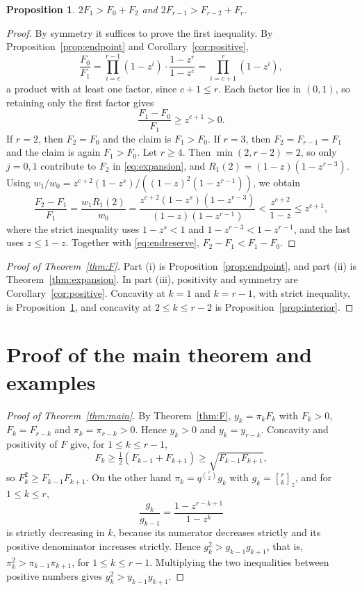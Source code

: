 \documentclass{amsart}
\newtheorem{proposition}[theorem]{Proposition}
\theoremstyle{remark}
\numberwithin{equation}{section}
\newcommand{\qbinom}[3]{\genfrac{[}{]}{0pt}{}{#1}{#2}_{#3}}
\begin{document}
\begin{proposition}\label{prop:boundary}
$2F_1>F_0+F_2$ and $2F_{r-1}>F_{r-2}+F_r$.
\end{proposition}

\begin{proof}
By symmetry it suffices to prove the first inequality. By Proposition~\ref{prop:endpoint} and Corollary~\ref{cor:positive},
\[
  \frac{F_0}{F_1}=\prod_{i=c}^{r-1}(1-z^i)\cdot\frac{1-z^r}{1-z^c}=\prod_{i=c+1}^{r}(1-z^i),
\]
a product with at least one factor, since $c+1\le r$. Each factor lies in $(0,1)$, so retaining only the first factor gives
\begin{equation}\label{eq:endreserve}
  \frac{F_1-F_0}{F_1}\ge z^{c+1}>0.
\end{equation}
If $r=2$, then $F_2=F_0$ and the claim is $F_1>F_0$. If $r=3$, then $F_2=F_{r-1}=F_1$ and the claim is again $F_1>F_0$. Let $r\ge4$. Then $\min(2,r-2)=2$, so only $j=0,1$ contribute to $F_2$ in \eqref{eq:expansion}, and $R_1(2)=(1-z)(1-z^{r-3})$. Using $w_1/w_0=z^{c+2}(1-z^s)/((1-z)^2(1-z^{r-1}))$, we obtain
\[
  \frac{F_2-F_1}{F_1}=\frac{w_1R_1(2)}{w_0}=\frac{z^{c+2}(1-z^s)(1-z^{r-3})}{(1-z)(1-z^{r-1})}<\frac{z^{c+2}}{1-z}\le z^{c+1},
\]
where the strict inequality uses $1-z^s<1$ and $1-z^{r-3}<1-z^{r-1}$, and the last uses $z\le1-z$. Together with \eqref{eq:endreserve}, $F_2-F_1<F_1-F_0$.
\end{proof}

\begin{proof}[Proof of Theorem~\ref{thm:F}]
Part (i) is Proposition~\ref{prop:endpoint}, and part (ii) is Theorem~\ref{thm:expansion}. In part (iii), positivity and symmetry are Corollary~\ref{cor:positive}. Concavity at $k=1$ and $k=r-1$, with strict inequality, is Proposition~\ref{prop:boundary}, and concavity at $2\le k\le r-2$ is Proposition~\ref{prop:interior}.
\end{proof}

\section{Proof of the main theorem and examples}\label{sec:proof}

\begin{proof}[Proof of Theorem~\ref{thm:main}]
By Theorem~\ref{thm:F}, $y_k=\pi_kF_k$ with $F_k>0$, $F_k=F_{r-k}$ and $\pi_k=\pi_{r-k}>0$. Hence $y_k>0$ and $y_k=y_{r-k}$. Concavity and positivity of $F$ give, for $1\le k\le r-1$,
\[
  F_k\ge\tfrac12(F_{k-1}+F_{k+1})\ge\sqrt{F_{k-1}F_{k+1}},
\]
so $F_k^2\ge F_{k-1}F_{k+1}$. On the other hand $\pi_k=q^{\binom r2}g_k$ with $g_k=\qbinom{r}{k}{z}$, and for $1\le k\le r$,
\[
  \frac{g_k}{g_{k-1}}=\frac{1-z^{r-k+1}}{1-z^k}
\]
is strictly decreasing in $k$, because its numerator decreases strictly and its positive denominator increases strictly. Hence $g_k^2>g_{k-1}g_{k+1}$, that is, $\pi_k^2>\pi_{k-1}\pi_{k+1}$, for $1\le k\le r-1$. Multiplying the two inequalities between positive numbers gives $y_k^2>y_{k-1}y_{k+1}$.
\end{proof}
\end{document}
